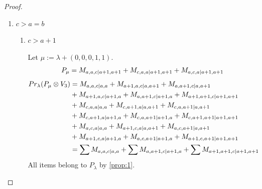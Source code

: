 \begin{proof}
\begin{enumerate}
    \item $c>a=b$
      \begin{enumerate}
        \item $c>a+1$ \par
        Let $\mu:=\lambda + (0,0,0,1,1) $.
        \begin{equation}\notag
          \begin{aligned}
            P_\mu = M_{a,a,c|a+1,a+1}
+ M_{c,a,a|a+1,a+1}
+ M_{a,c,a|a+1,a+1}
          \end{aligned}
        \end{equation}
        \begin{equation}\notag
          \begin{aligned}
            Pr_{\lambda}(P_\mu \otimes V_{3}) &=
M_{a,a,c|a,a}
+ M_{a+1,a,c|a,a+1}
+ M_{a,a+1,c|a,a+1}\\
                                              &
+ M_{a+1,a,c|a+1,a}
+ M_{a,a+1,c|a+1,a}
+ M_{a+1,a+1,c|a+1,a+1}\\
                                              &
+ M_{c,a,a|a,a}
+ M_{c,a+1,a|a,a+1}
+ M_{c,a,a+1|a,a+1}\\
                                              &
+ M_{c,a+1,a|a+1,a}
+ M_{c,a,a+1|a+1,a}
+ M_{c,a+1,a+1|a+1,a+1}\\
                                              &
+ M_{a,c,a|a,a}
+ M_{a+1,c,a|a,a+1}
+ M_{a,c,a+1|a,a+1}\\
                                              &
+ M_{a+1,c,a|a+1,a}
+ M_{a,c,a+1|a+1,a}
+ M_{a+1,c,a+1|a+1,a+1} \\
                                               &=
\sum M_{a,a,c|a,a}
+ \sum M_{a,a+1,c|a+1,a}
+ \sum M_{a+1,a+1,c|a+1,a+1}
          \end{aligned}
        \end{equation}
All items belong to $P_\lambda$ by \cref{prop:1}.


\end{enumerate}
\end{enumerate}
\end{proof}
